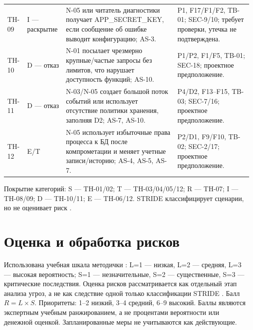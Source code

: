 \documentclass[12pt,a4paper]{article}
\begin{document}
\begin{longtable}{p{1.4cm}p{2.3cm}p{7.8cm}p{3.3cm}}
TH-09 & I — раскрытие & N-05 или читатель диагностики получает APP\_SECRET\_KEY, если сообщение об ошибке выводит конфигурацию; AS-3. & P1, F17/F1/F2, TB-01; SEC-9/10; требует проверки, утечка не подтверждена.\\
TH-10 & D — отказ & N-01 посылает чрезмерно крупные/частые запросы без лимитов, что нарушает доступность функций; AS-10. & P1/P2, F1/F5, TB-01; SEC-18; проектное предположение.\\
TH-11 & D — отказ & N-03/N-05 создает большой поток событий или использует отсутствие политики хранения, заполняя D2; AS-7, AS-10. & P4/D2, F13–F15, TB-03; SEC-7/16; проектное предположение.\\
TH-12 & E/T & N-05 использует избыточные права процесса к БД после компрометации и меняет учетные записи/историю; AS-4, AS-5, AS-7. & P2/D1, F9/F10, TB-02; SEC-2/17; проектное предположение.\\
\bottomrule
\end{longtable}

Покрытие категорий: S — TH-01/02; T — TH-03/04/05/12; R — TH-07; I — TH-08/09; D — TH-10/11; E — TH-06/12. STRIDE классифицирует сценарии, но не оценивает риск \cite{microsoft-stride,owasp-threat}.

\section{Оценка и обработка рисков}
Использована учебная шкала методички \cite{method3}: L=1 — низкая, L=2 — средняя, L=3 — высокая вероятность; S=1 — незначительные, S=2 — существенные, S=3 — критические последствия. Оценка рисков рассматривается как отдельный этап анализа угроз, а не как следствие одной только классификации STRIDE \cite{nist-risk}. Балл \(R=L\times S\). Приоритеты: 1–2 низкий, 3–4 средний, 6–9 высокий. Баллы являются экспертным учебным ранжированием, а не процентами вероятности или денежной оценкой. Запланированные меры не учитываются как действующие.
\end{document}
